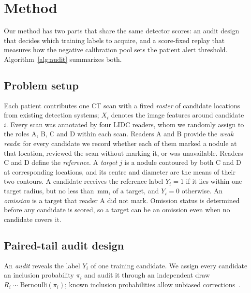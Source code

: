 \section{Method}
\label{sec:methods}

Our method has two parts that share the same detector scores: an audit design that decides which training labels to acquire, and a score-fixed replay that measures how the negative calibration pool sets the patient alert threshold. Algorithm~\ref{alg:audit} summarizes both.

\subsection{Problem setup}
\label{sec:setting}

Each patient contributes one CT scan with a fixed \emph{roster} of candidate locations from existing detection systems; $X_i$ denotes the image features around candidate $i$. Every scan was annotated by four LIDC readers, whom we randomly assign to the roles A, B, C and D within each scan. Readers A and B provide the \emph{weak reads}: for every candidate we record whether each of them marked a nodule at that location, reviewed the scan without marking it, or was unavailable. Readers C and D define the \emph{reference}. A \emph{target} $j$ is a nodule contoured by both C and D at corresponding locations, and its centre and diameter are the means of their two contours. A candidate receives the reference label $Y_i=1$ if it lies within one target radius, but no less than \MinRadiusMM\,mm, of a target, and $Y_i=0$ otherwise. An \emph{omission} is a target that reader A did not mark. Omission status is determined before any candidate is scored, so a target can be an omission even when no candidate covers it.

\subsection{Paired-tail audit design}
\label{sec:audit}

An \emph{audit} reveals the label $Y_i$ of one training candidate. We assign every candidate an inclusion probability $\pi_i$ and audit it through an independent draw $R_i\sim\mathrm{Bernoulli}(\pi_i)$; known inclusion probabilities allow unbiased corrections~\cite{horvitz1952}.

